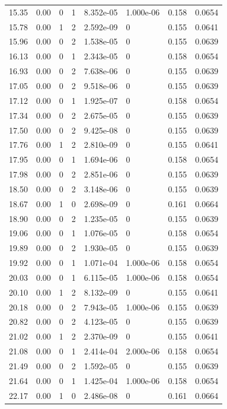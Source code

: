 \documentclass[preview]{standalone}
\begin{document}
{{{\begin{tabular}{L{1.2cm}C{1.2cm} C{0.3cm}C{0.5cm} C{1.4cm}C{1.4cm} C{1.4cm}C{1.4cm}}
  15.35  &  0.00  & 0     &  1 &  8.352e-05  & 1.000e-06  & 0.158 &  0.0654   \\ 
  15.78  &  0.00  & 1     &  2 &  2.592e-09  & 0  & 0.155 &  0.0641   \\ 
  15.96  &  0.00  & 0     &  2 &  1.538e-05  & 0  & 0.155 &  0.0639   \\ 
  16.13  &  0.00  & 0     &  1 &  2.343e-05  & 0  & 0.158 &  0.0654   \\ 
  16.93  &  0.00  & 0     &  2 &  7.638e-06  & 0  & 0.155 &  0.0639   \\ 
  17.05  &  0.00  & 0     &  2 &  9.518e-06  & 0  & 0.155 &  0.0639   \\ 
  17.12  &  0.00  & 0     &  1 &  1.925e-07  & 0  & 0.158 &  0.0654   \\ 
  17.34  &  0.00  & 0     &  2 &  2.675e-05  & 0  & 0.155 &  0.0639   \\ 
  17.50  &  0.00  & 0     &  2 &  9.425e-08  & 0  & 0.155 &  0.0639   \\ 
  17.76  &  0.00  & 1     &  2 &  2.810e-09  & 0  & 0.155 &  0.0641   \\ 
  17.95  &  0.00  & 0     &  1 &  1.694e-06  & 0  & 0.158 &  0.0654   \\ 
  17.98  &  0.00  & 0     &  2 &  2.851e-06  & 0  & 0.155 &  0.0639   \\ 
  18.50  &  0.00  & 0     &  2 &  3.148e-06  & 0  & 0.155 &  0.0639   \\ 
  18.67  &  0.00  & 1     &  0 &  2.698e-09  & 0  & 0.161 &  0.0664   \\ 
  18.90  &  0.00  & 0     &  2 &  1.235e-05  & 0  & 0.155 &  0.0639   \\ 
  19.06  &  0.00  & 0     &  1 &  1.076e-05  & 0  & 0.158 &  0.0654   \\ 
  19.89  &  0.00  & 0     &  2 &  1.930e-05  & 0  & 0.155 &  0.0639   \\ 
  19.92  &  0.00  & 0     &  1 &  1.071e-04  & 1.000e-06  & 0.158 &  0.0654   \\ 
  20.03  &  0.00  & 0     &  1 &  6.115e-05  & 1.000e-06  & 0.158 &  0.0654   \\ 
  20.10  &  0.00  & 1     &  2 &  8.132e-09  & 0  & 0.155 &  0.0641   \\ 
  20.18  &  0.00  & 0     &  2 &  7.943e-05  & 1.000e-06  & 0.155 &  0.0639   \\ 
  20.82  &  0.00  & 0     &  2 &  4.123e-05  & 0  & 0.155 &  0.0639   \\ 
  21.02  &  0.00  & 1     &  2 &  2.370e-09  & 0  & 0.155 &  0.0641   \\ 
  21.08  &  0.00  & 0     &  1 &  2.414e-04  & 2.000e-06  & 0.158 &  0.0654   \\ 
  21.49  &  0.00  & 0     &  2 &  1.592e-05  & 0  & 0.155 &  0.0639   \\ 
  21.64  &  0.00  & 0     &  1 &  1.425e-04  & 1.000e-06  & 0.158 &  0.0654   \\ 
  22.17  &  0.00  & 1     &  0 &  2.486e-08  & 0  & 0.161 &  0.0664   \\ 
\hline 
\end{tabular} 

}}}
\end{document}
